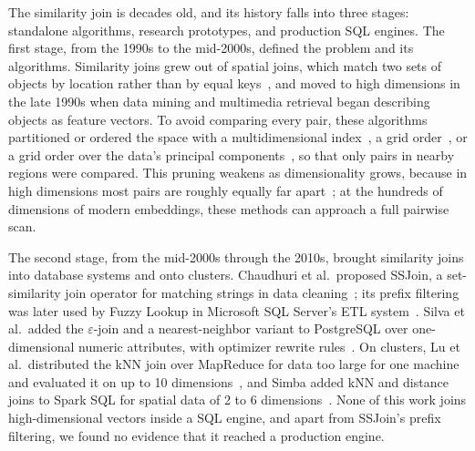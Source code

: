 The similarity join is decades old, and its history falls into three stages: standalone algorithms, research prototypes, and production SQL engines.
The first stage, from the 1990s to the mid-2000s, defined the problem and its algorithms.
Similarity joins grew out of spatial joins, which match two sets of objects by location rather than by equal keys~\cite{BrinkhoffSpatialJoin93}, and moved to high dimensions in the late 1990s when data mining and multimedia retrieval began describing objects as feature vectors.
To avoid comparing every pair, these algorithms partitioned or ordered the space with a multidimensional index~\cite{ShimSimJoin97}, a grid order~\cite{BohmEGO01}, or a grid order over the data's principal components~\cite{XiaGorder04}, so that only pairs in nearby regions were compared.
This pruning weakens as dimensionality grows, because in high dimensions most pairs are roughly equally far apart~\cite{BeyerNNMeaningful99}; at the hundreds of dimensions of modern embeddings, these methods can approach a full pairwise scan.

The second stage, from the mid-2000s through the 2010s, brought similarity joins into database systems and onto clusters.
Chaudhuri et al.\ proposed SSJoin, a set-similarity join operator for matching strings in data cleaning~\cite{ChaudhuriSSJoin06}; its prefix filtering was later used by Fuzzy Lookup in Microsoft SQL Server's ETL system~\cite{ArasuDataCleaning11}.
Silva et al.\ added the $\varepsilon$-join and a nearest-neighbor variant to PostgreSQL over one-dimensional numeric attributes, with optimizer rewrite rules~\cite{SilvaSimJoinOp10}.
On clusters, Lu et al.\ distributed the kNN join over MapReduce for data too large for one machine and evaluated it on up to 10 dimensions~\cite{LuKNNMapReduce12}, and Simba added kNN and distance joins to Spark SQL for spatial data of 2 to 6 dimensions~\cite{XieSimba16}.
None of this work joins high-dimensional vectors inside a SQL engine, and apart from SSJoin's prefix filtering, we found no evidence that it reached a production engine.

